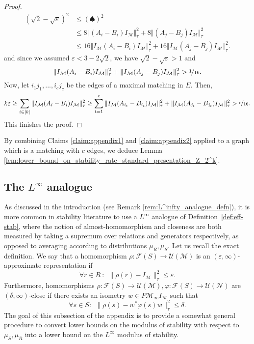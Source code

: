 \documentclass[11pt]{article}
\theoremstyle{definition}
\newcommand{\Id}{\ensuremath{I}}
\newcommand{\mF}{\ensuremath{\mathcal{F}}}
\newcommand{\mM}{\ensuremath{\mathcal{M}}}
\newcommand{\mU}{\ensuremath{\mathcal{U}}}
\newcommand{\eps}{\varepsilon}
\newcommand{\mN}{\mathcal{N}}
\begin{document}
\begin{proof}
\begin{align*}
    (\sqrt{2}-\sqrt\eps)^2&\leq (\spadesuit)^2\\
    &\leq 8\Vert(A_i-B_i)\Id_\mM\Vert_\tau^2+8\Vert(A_j-B_j)\Id_\mM\Vert_\tau^2\\
    &\leq 16 \Vert \Id_\mM (A_i-B_i)\Id_\mM\Vert_\tau^2+16 \Vert \Id_\mM (A_j-B_j)\Id_\mM\Vert_\tau^2.
\end{align*}
and since we assumed $\eps<3-2\sqrt{2}$, we have $\sqrt{2}-\sqrt\eps> 1$ and 
\[
 \Vert \Id_\mM (A_i-B_i)\Id_\mM\Vert_\tau^2+ \Vert \Id_\mM (A_j-B_j)\Id_\mM\Vert_\tau^2> \nicefrac{1}{16}.
\]
Now, let $i_1j_1,...,i_cj_c$ be the edges of a maximal  matching in $E$. Then,
\[
k\eps \geq \sum_{i\in [k]}\Vert \Id_\mM (A_i-B_i)\Id_\mM\Vert_\tau^2\geq \sum_{t=1}^c\Vert \Id_\mM (A_{i_t}-B_{i_t})\Id_\mM\Vert_\tau^2+ \Vert \Id_\mM (A_{j_t}-B_{j_t})\Id_\mM\Vert_\tau^2>\nicefrac{c}{16}.
\]
This finishes the proof.
\end{proof}

By combining Claims \ref{claim:appendix1} and \ref{claim:appendix2} applied to a graph which is a matching with $c$ edges, we deduce Lemma \ref{lem:lower_bound_on_stability_rate_standard_presentation_Z_2^k}.


\subsection{The $L^\infty$ analogue}
As discussed in the introduction (see Remark \ref{rem:L^infty_analogue_defn}), it is more common in stability literature to use a $L^\infty$ analogue of Definition~\ref{def:eff-stab}, where the notion of almost-homomorphism and closeness are both measured by taking a supremum over relations and generators respectively, as opposed to averaging according to distributions $\mu_R,\mu_S$. 
Let us recall the exact definition. We say that a homomorphism $\rho\colon \mF(S)\to \mU(\mM)$ is an $(\eps,\infty)$-approximate representation if 
\[
\forall r\in R\ \colon \ \ \|\rho(r)-\Id_\mM\|_\tau^2\leq \eps.
\]
Furthermore, homomorphisms $\rho\colon \mF(S)\to \mU(\mM),\varphi\colon \mF(S)\to \mU(\mN)$ are $(\delta,\infty)$-close if there exists an isometry $w\in P\mM_\infty \Id_\mM$ such that
\[
\forall s\in S\colon\ \ \|\rho(s)-w^*\varphi(s)w\|_\tau^2\leq \delta.
\]
The goal of this subsection of the appendix is to provide a somewhat general procedure to convert lower bounds on the modulus of stability with respect to $\mu_S,\mu_R$ into a lower bound on the $L^\infty$ modulus of stability.
\end{document}
